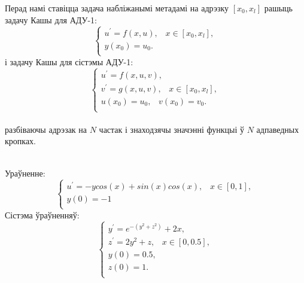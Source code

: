 Перад намі ставіцца задача набліжанымі метадамі на адрэзку $[x_0, x_l]$ рашыць задачу Кашы для АДУ-1:
\begin{equation}
    \begin{cases}
        u^{\prime} = f(x,u), \hspace{10pt} x \in [x_0, x_l],\\
        y(x_0) = u_0. \\
    \end{cases}
\end{equation}
і задачу Кашы для сістэмы АДУ-1:
\begin{equation}
    \begin{cases}
        u^{\prime} = f(x, u, v), \\
        v^{\prime} = g(x, u, v), \hspace{10pt} x \in [x_0, x_l],\\
        u(x_0) = u_0, \hspace{10pt} v(x_0) = v_0. \\
    \end{cases}
\end{equation} \\
разбіваючы адрэзак на $N$ частак і знаходзячы значэнні функцыі ў $N$ адпаведных кропках.\par
\\
Ураўненне:
\begin{equation}
    \begin{cases}
        u^{\prime} = -y cos(x) + sin(x)cos(x), \hspace{10pt} x \in [0, 1],\\
        y(0) = -1 \\
    \end{cases}
\end{equation}
Сістэма ўраўненняў:
\begin{equation}
    \begin{cases}
        y^{\prime} = e ^{-(y^2+z^2)} + 2x, \\
        z^{\prime} = 2y^2 + z, \hspace{10pt} x \in [0, 0.5], \\
        y(0) = 0.5, \\
        z(0) = 1. \\
    \end{cases}
\end{equation}
